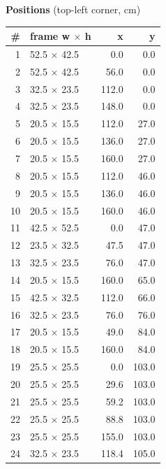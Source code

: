 \documentclass[a4paper,landscape,10pt]{article}
\begin{document}
\begin{minipage}[t]{0.25\textwidth}
\vspace{8pt}
{\bfseries Positions} (top-left corner, cm)\\[2pt]
\tiny
\begin{tabular}{@{}r l r r@{}}
\toprule
\# & frame w $\times$ h & x & y \\
\midrule
1 & 52.5 $\times$ 42.5 & 0.0 & 0.0 \\
2 & 52.5 $\times$ 42.5 & 56.0 & 0.0 \\
3 & 32.5 $\times$ 23.5 & 112.0 & 0.0 \\
4 & 32.5 $\times$ 23.5 & 148.0 & 0.0 \\
5 & 20.5 $\times$ 15.5 & 112.0 & 27.0 \\
6 & 20.5 $\times$ 15.5 & 136.0 & 27.0 \\
7 & 20.5 $\times$ 15.5 & 160.0 & 27.0 \\
8 & 20.5 $\times$ 15.5 & 112.0 & 46.0 \\
9 & 20.5 $\times$ 15.5 & 136.0 & 46.0 \\
10 & 20.5 $\times$ 15.5 & 160.0 & 46.0 \\
11 & 42.5 $\times$ 52.5 & 0.0 & 47.0 \\
12 & 23.5 $\times$ 32.5 & 47.5 & 47.0 \\
13 & 32.5 $\times$ 23.5 & 76.0 & 47.0 \\
14 & 20.5 $\times$ 15.5 & 160.0 & 65.0 \\
15 & 42.5 $\times$ 32.5 & 112.0 & 66.0 \\
16 & 32.5 $\times$ 23.5 & 76.0 & 76.0 \\
17 & 20.5 $\times$ 15.5 & 49.0 & 84.0 \\
18 & 20.5 $\times$ 15.5 & 160.0 & 84.0 \\
19 & 25.5 $\times$ 25.5 & 0.0 & 103.0 \\
20 & 25.5 $\times$ 25.5 & 29.6 & 103.0 \\
21 & 25.5 $\times$ 25.5 & 59.2 & 103.0 \\
22 & 25.5 $\times$ 25.5 & 88.8 & 103.0 \\
23 & 25.5 $\times$ 25.5 & 155.0 & 103.0 \\
24 & 32.5 $\times$ 23.5 & 118.4 & 105.0 \\
\bottomrule
\end{tabular}
\end{minipage}
\clearpage
\end{document}
